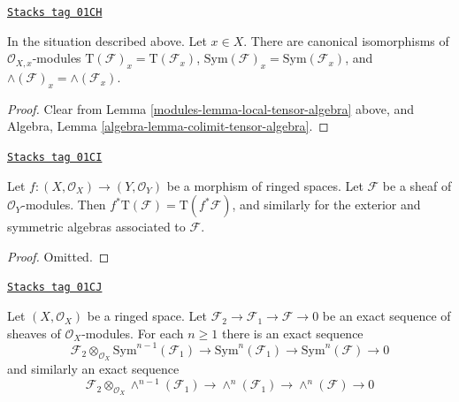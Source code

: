\begin{lemma}
\label{modules-lemma-stalk-tensor-algebra}
\href{https://stacks.math.columbia.edu/tag/01CH}{\texttt{Stacks tag 01CH}}

In the situation described above. Let $x \in X$.
There are canonical isomorphisms of $\mathcal{O}_{X, x}$-modules
$\text{T}(\mathcal{F})_x = \text{T}(\mathcal{F}_x)$,
$\text{Sym}(\mathcal{F})_x = \text{Sym}(\mathcal{F}_x)$, and
$\wedge(\mathcal{F})_x = \wedge(\mathcal{F}_x)$.
\end{lemma}

\begin{proof}

Clear from Lemma \ref{modules-lemma-local-tensor-algebra} above, and
Algebra, Lemma \ref{algebra-lemma-colimit-tensor-algebra}.
\end{proof}

\begin{lemma}
\label{modules-lemma-pullback-tensor-algebra}
\href{https://stacks.math.columbia.edu/tag/01CI}{\texttt{Stacks tag 01CI}}

Let $f : (X, \mathcal{O}_X) \to (Y, \mathcal{O}_Y)$ be a morphism of
ringed spaces. Let $\mathcal{F}$ be a sheaf of $\mathcal{O}_Y$-modules.
Then $f^*\text{T}(\mathcal{F}) = \text{T}(f^*\mathcal{F})$,
and similarly for the exterior and symmetric algebras associated
to $\mathcal{F}$.
\end{lemma}

\begin{proof}
Omitted.
\end{proof}

\begin{lemma}
\label{modules-lemma-presentation-sym-exterior}
\href{https://stacks.math.columbia.edu/tag/01CJ}{\texttt{Stacks tag 01CJ}}

Let $(X, \mathcal{O}_X)$ be a ringed space.
Let $\mathcal{F}_2 \to \mathcal{F}_1 \to \mathcal{F} \to 0$
be an exact sequence of sheaves of $\mathcal{O}_X$-modules.
For each $n \geq 1$ there is an exact sequence
$$
\mathcal{F}_2 \otimes_{\mathcal{O}_X} \text{Sym}^{n - 1}(\mathcal{F}_1)
\to
\text{Sym}^n(\mathcal{F}_1)
\to
\text{Sym}^n(\mathcal{F})
\to
0
$$
and similarly an exact sequence
$$
\mathcal{F}_2 \otimes_{\mathcal{O}_X} \wedge^{n - 1}(\mathcal{F}_1)
\to
\wedge^n(\mathcal{F}_1)
\to
\wedge^n(\mathcal{F})
\to
0
$$
\end{lemma}

